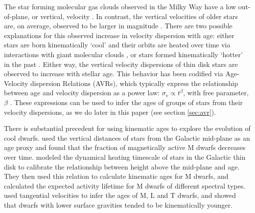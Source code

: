 The star forming molecular gas clouds observed in the Milky Way have a low
out-of-plane, or vertical, velocity \citep[\eg][]{stark1989, stark2005,
aumer2009, martig2014, aumer2016}.
In contrast, the vertical velocities of older stars are, on average, observed
to be larger in magnitude \citep{stromberg1946, wielen1977, nordstrom2004,
holmberg2007, holmberg2009, aumer2009, casagrande2011, ting2019, yu2018}.
There are two possible explanations for this observed increase in velocity
dispersion with age: either stars are born kinematically `cool' and their
orbits are heated over time via interactions with giant molecular clouds
\citep[see][for a review of secular evolution in the MW]{sellwood2014}, or
stars formed kinematically `hotter' in the past \citep[\eg][]{bird2013}.
Either way, the vertical velocity dispersions of thin disk stars are observed
to increase with stellar age.
This behavior has been codified via Age-Velocity dispersion Relations (AVRs),
which typically express the relationship between age and velocity dispersion
as a power law: $\sigma_v \propto t^\beta$, with free parameter, $\beta$
\citep[\eg][]{holmberg2009, yu2018}.
These expressions can be used to infer the ages of groups of stars from their
velocity dispersions, as we do later in this paper (see section
\ref{sec:avr}).

There is substantial precedent for using kinematic ages to explore the
evolution of cool dwarfs.
\citet{west2004, west2006} used the vertical distances of stars from the
Galactic mid-plane as an age proxy and found that the fraction of magnetically
active M dwarfs decreases over time.
\citet{west2008} modeled the dynamical heating timescale of stars in the
Galactic thin disk to calibrate the relationship between height above the
mid-plane and age.
They then used this relation to calculate kinematic ages for M dwarfs, and
calculated the expected activity lifetime for M dwarfs of different spectral
types.
\citet{faherty2009} used tangential velocities to infer the ages of M, L and T
dwarfs, and showed that dwarfs with lower surface gravities tended to be
kinematically younger.

